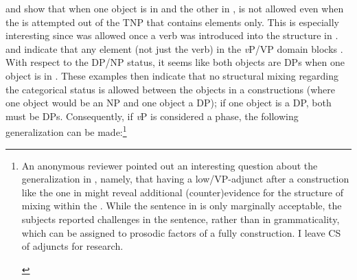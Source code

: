 \documentclass[output=paper,hidelinks,newtxmath,]{langscibook}
\begin{document}
\noindent {} and  show that when one object is in  and the other in ,  is not allowed even when the  is attempted out of the TNP that contains  elements only. This is especially interesting since  was allowed once a  verb was introduced into the structure in .  and  indicate that any  element (not just the verb) in the \textit{v}P/VP domain blocks . With respect to the DP/NP status, it seems like both objects are DPs when one object is in . These examples then indicate that no structural mixing regarding the categorical status is allowed between the objects in a  constructions (where one object would be an NP and one object a DP); if one object is a DP, both must be DPs. Consequently, if \textit{v}P is considered a phase, the following generalization can be made:\footnote{\label{15:fn12}An anonymous reviewer pointed out an interesting question about the generalization in , namely, that having a  low/VP-adjunct after a   construction like the one in  might reveal additional (counter)evidence for the structure of mixing within the . While the sentence in  is only marginally acceptable, the subjects reported challenges in  the sentence, rather than in grammaticality, which can be assigned to prosodic factors of a fully   construction. I leave CS of adjuncts for  research.

\ea\label{15:fn12ex}
\z\z

}
\end{document}
